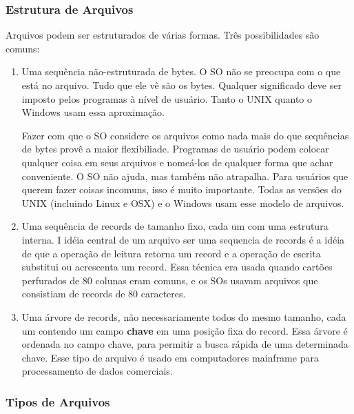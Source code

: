\documentclass[10pt]{article}
\begin{document}
\subsubsection{Estrutura de Arquivos}
Arquivos podem ser estruturados de várias formas. Três possibilidades são comuns:
\begin{enumerate}
    \item Uma sequência não-estruturada de bytes. O SO não se preocupa com o que está no arquivo.
    Tudo que ele vê são os bytes. Qualquer significado deve ser imposto pelos programas à nível de
    usuário. Tanto o UNIX quanto o Windows usam essa aproximação. 

    Fazer com que o SO considere os arquivos como nada mais do que sequências de bytes provê a 
    maior flexibiliade. Programas de usuário podem colocar qualquer coisa em seus arquivos e nomeá-los
    de qualquer forma que achar conveniente. O SO não ajuda, mas também não atrapalha. Para usuários
    que querem fazer coisas incomuns, isso é muito importante. Todas as versões do UNIX (incluindo
    Linux e OSX) e o Windows usam esse modelo de arquivos.

    \item Uma sequência de records de tamanho fixo, cada um com uma estrutura interna. I idéia central
    de um arquivo ser uma sequencia de records é a idéia de que a operação de leitura retorna um record
    e a operação de escrita substitui ou acrescenta um record. Essa técnica era usada quando cartões perfurados
    de 80 colunas eram comuns, e os SOs usavam arquivos que consistiam de records de 80 caracteres.

    \item Uma árvore de records, não necessariamente todos do mesmo tamanho, cada um contendo um campo 
    \textbf{chave} em uma posição fixa do record. Essa árvore é ordenada no campo chave, para permitir
    a busca rápida de uma determinada chave. Esse tipo de arquivo é usado em computadores mainframe
    para processamento de dados comerciais.
\end{enumerate}

\subsubsection{Tipos de Arquivos} 
\end{document}
